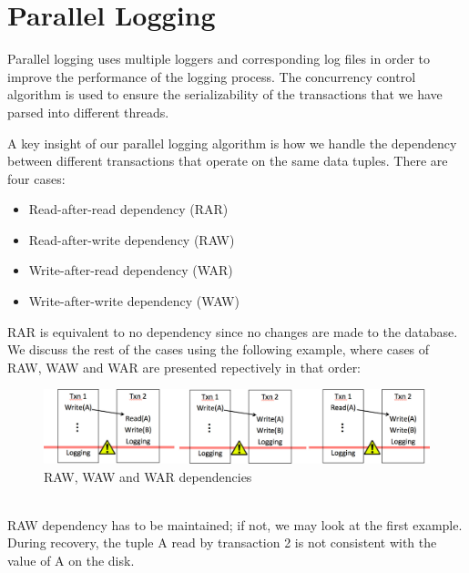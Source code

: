 \section{Parallel Logging}
Parallel logging uses multiple loggers and corresponding log files in order to improve the performance of the logging process. The concurrency control algorithm is used to ensure the serializability of the transactions that we have parsed into different threads. \par


A key insight of our parallel logging algorithm is how we handle the dependency between different transactions that operate on the same data tuples. There are four cases:
\begin{itemize}
\item Read-after-read dependency (RAR)
\item Read-after-write dependency (RAW)
\item Write-after-read dependency (WAR)
\item Write-after-write dependency (WAW)
\end{itemize}
RAR is equivalent to no dependency since no changes are made to the database. We discuss the rest of the cases using the following example, where cases of RAW, WAW and WAR are presented repectively in that order:
\begin{figure}[!h]
\caption{RAW, WAW and WAR dependencies}
\includegraphics[width=\textwidth]{Dependencies.jpg}
\end{figure}\\
RAW dependency has to be maintained; if not, we may look at the first example. During recovery, the tuple A read by transaction 2 is not consistent with the value of A on the disk. 

